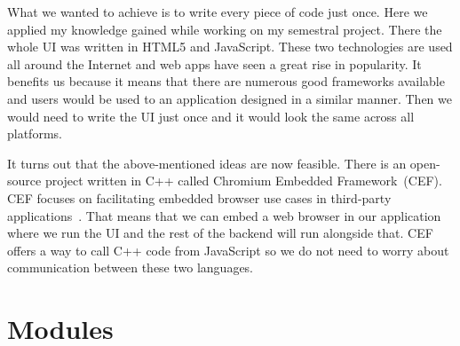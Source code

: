 \par
What we wanted to achieve is to write every piece of code just once. Here we applied my knowledge gained while working on my semestral project. There the whole UI was written in HTML5 and JavaScript. These two technologies are used all around the Internet and web apps have seen a great rise in popularity. It benefits us because it means that there are numerous good frameworks available and users would be used to an application designed in a similar manner. Then we would need to write the UI just once and it would look the same across all platforms.
\par
It turns out that the above-mentioned ideas are now feasible. There is an open-source project written in C++ called Chromium Embedded Framework~(CEF). CEF focuses on facilitating embedded browser use cases in third-party applications~\citep{cef}. That means that we can embed a web browser in our application where we run the UI and the rest of the backend will run alongside that. CEF offers a way to call C++ code from JavaScript so we do not need to worry about communication between these two languages.

\section{Modules}

